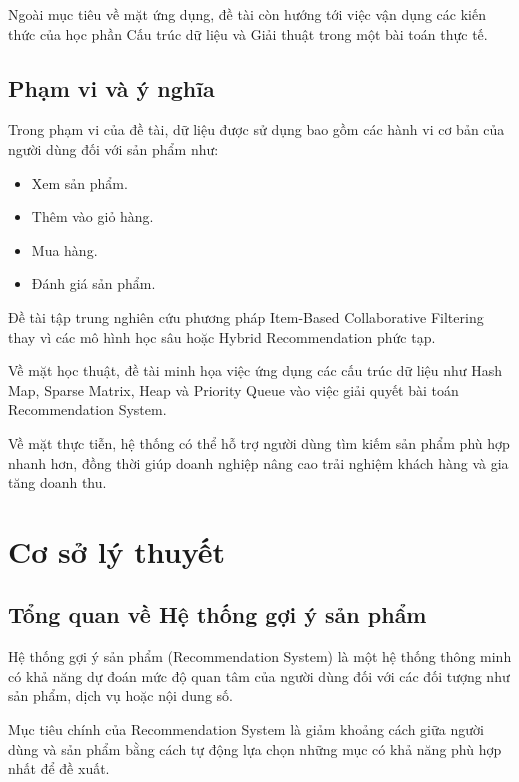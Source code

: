 \documentclass{report}
\begin{document}
Ngoài mục tiêu về mặt ứng dụng, đề tài còn hướng tới việc vận dụng các kiến thức của học phần Cấu trúc dữ liệu và Giải thuật trong một bài toán thực tế.

\section{Phạm vi và ý nghĩa}

Trong phạm vi của đề tài, dữ liệu được sử dụng bao gồm các hành vi cơ bản của người dùng đối với sản phẩm như:

\begin{itemize}
\item Xem sản phẩm.
\item Thêm vào giỏ hàng.
\item Mua hàng.
\item Đánh giá sản phẩm.
\end{itemize}

Đề tài tập trung nghiên cứu phương pháp Item-Based Collaborative Filtering thay vì các mô hình học sâu hoặc Hybrid Recommendation phức tạp.

Về mặt học thuật, đề tài minh họa việc ứng dụng các cấu trúc dữ liệu như Hash Map, Sparse Matrix, Heap và Priority Queue vào việc giải quyết bài toán Recommendation System.

Về mặt thực tiễn, hệ thống có thể hỗ trợ người dùng tìm kiếm sản phẩm phù hợp nhanh hơn, đồng thời giúp doanh nghiệp nâng cao trải nghiệm khách hàng và gia tăng doanh thu.


\chapter{Cơ sở lý thuyết}
\label{chap:lythuyet}

\section{Tổng quan về Hệ thống gợi ý sản phẩm}

Hệ thống gợi ý sản phẩm (Recommendation System) là một hệ thống thông minh có khả năng dự đoán mức độ quan tâm của người dùng đối với các đối tượng như sản phẩm, dịch vụ hoặc nội dung số.

Mục tiêu chính của Recommendation System là giảm khoảng cách giữa người dùng và sản phẩm bằng cách tự động lựa chọn những mục có khả năng phù hợp nhất để đề xuất.
\end{document}
